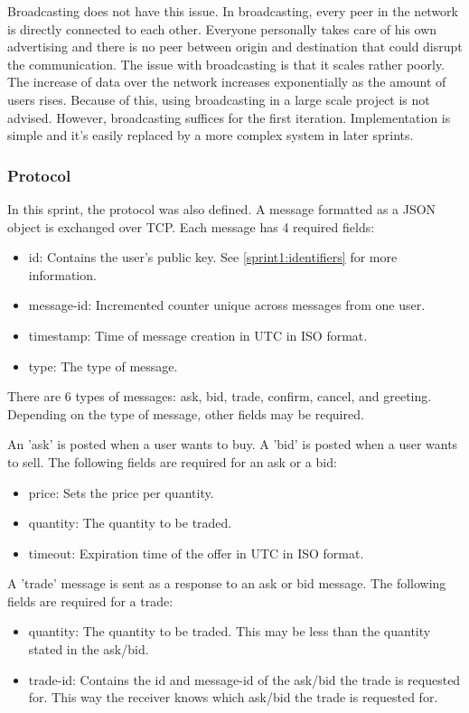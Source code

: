 \documentclass[]{article}
\newenvironment{myitemize}
{ \begin{itemize}
    \setlength{\itemsep}{0pt}
    \setlength{\parskip}{0pt}
    \setlength{\parsep}{0pt}     }
{ \end{itemize}                  }
\begin{document}
Broadcasting does not have this issue.
In broadcasting, every peer in the network is directly connected to each other.
Everyone personally takes care of his own advertising and there is no peer between origin and destination that could disrupt the communication.
The issue with broadcasting is that it scales rather poorly.
The increase of data over the network increases exponentially as the amount of users rises.
Because of this, using broadcasting in a large scale project is not advised.
However, broadcasting suffices for the first iteration.
Implementation is simple and it's easily replaced by a more complex system in later sprints.

\subsubsection{Protocol}

In this sprint, the protocol was also defined.
A message formatted as a JSON object is exchanged over TCP.
Each message has 4 required fields:
\begin{myitemize}
\item id: Contains the user's public key. See \ref{sprint1:identifiers} for more information.
\item message-id: Incremented counter unique across messages from one user.
\item timestamp: Time of message creation in UTC in ISO format.
\item type: The type of message.
\end{myitemize}

There are 6 types of messages: ask, bid, trade, confirm, cancel, and greeting.
Depending on the type of message, other fields may be required.

An 'ask' is posted when a user wants to buy.
A 'bid' is posted when a user wants to sell.
The following fields are required for an ask or a bid:
\begin{myitemize}
	\item price: Sets the price per quantity.
	\item quantity: The quantity to be traded.
	\item timeout: Expiration time of the offer in UTC in ISO format.
\end{myitemize}

A 'trade' message is sent as a response to an ask or bid message.
The following fields are required for a trade:
\begin{myitemize}
	\item quantity: The quantity to be traded. This may be less than the quantity stated in the ask/bid.
	\item trade-id: Contains the id and message-id of the ask/bid the trade is requested for. This way the receiver knows which ask/bid the trade is requested for.
\end{myitemize}
\end{document}
